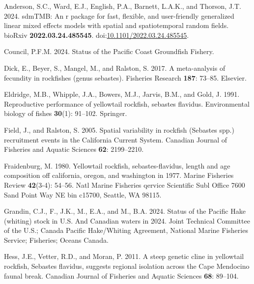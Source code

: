 \documentclass[
]{scrartcl}
\newlength{\cslhangindent}
\newenvironment{CSLReferences}[2] %
 {\begin{list}{}{%
  \setlength{\itemindent}{0pt}
  \setlength{\leftmargin}{0pt}
  \setlength{\parsep}{0pt}
  \ifodd #1
   \setlength{\leftmargin}{\cslhangindent}
   \setlength{\itemindent}{-1\cslhangindent}
  \fi
  \setlength{\itemsep}{#2\baselineskip}}}
 {\end{list}}
\begin{document}
\label{refs}
\begin{CSLReferences}{1}{0}
Anderson, S.C., Ward, E.J., English, P.A., Barnett, L.A.K., and Thorson,
J.T. 2024. sdmTMB: An r package for fast, flexible, and user-friendly
generalized linear mixed effects models with spatial and spatiotemporal
random fields. bioRxiv \textbf{2022.03.24.485545}.
doi:\href{https://doi.org/10.1101/2022.03.24.485545}{10.1101/2022.03.24.485545}.

Council, P.F.M. 2024. {Status of the Pacific Coast Groundfish Fishery}.

Dick, E., Beyer, S., Mangel, M., and Ralston, S. 2017. A meta-analysis
of fecundity in rockfishes (genus sebastes). Fisheries Research
\textbf{187}: 73--85. Elsevier.

Eldridge, M.B., Whipple, J.A., Bowers, M.J., Jarvis, B.M., and Gold, J.
1991. Reproductive performance of yellowtail rockfish, sebastes
flavidus. Environmental biology of fishes \textbf{30}(1): 91--102.
Springer.

Field, J., and Ralston, S. 2005. {Spatial variability in rockfish
(Sebastes spp.) recruitment events in the California Current System}.
Canadian Journal of Fisheries and Aquatic Sciences \textbf{62}:
2199--2210.

Fraidenburg, M. 1980. Yellowtail rockfish, sebastes-flavidus, length and
age composition off california, oregon, and washington in 1977. Marine
Fisheries Review \textbf{42}(3-4): 54--56. Natl Marine Fisheries qervice
Scientific Subl Office 7600 Sand Point Way NE bin c15700, Seattle, WA
98115.

Grandin, C.J., F., J.K., M., E.A., and M., B.A. 2024. Status of the
{P}acific {H}ake (whiting) stock in {U}.{S}. And {C}anadian waters in
2024. Joint Technical Committee of the U.S.; Canada Pacific Hake/Whiting
Agreement, National Marine Fisheries Service; Fisheries; Oceans Canada.

Hess, J.E., Vetter, R.D., and Moran, P. 2011. {A steep genetic cline in
yellowtail rockfish, Sebastes flavidus, suggests regional isolation
across the Cape Mendocino faunal break}. Canadian Journal of Fisheries
and Aquatic Sciences \textbf{68}: 89--104.


\end{CSLReferences}
\end{document}

